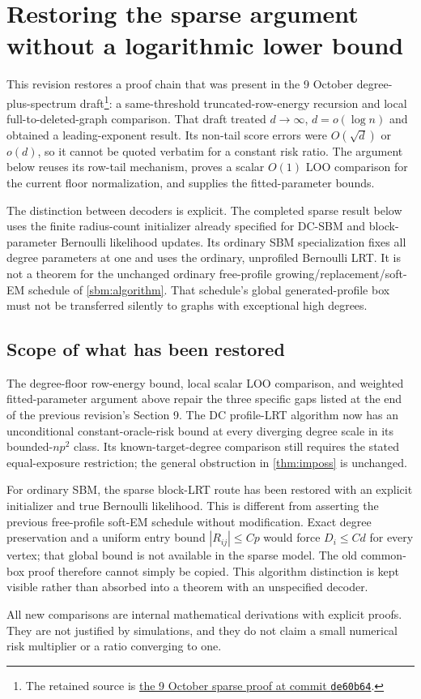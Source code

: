 \section{Restoring the sparse argument without a logarithmic lower bound}
\label{sec:sparse-restored}

This revision restores a proof chain that was present in the 9 October
degree-plus-spectrum draft\footnote{The retained source is
\href{https://github.com/zhixin0825/spectral-lrt/blob/de60b64c7d7f127ae6dc1d010c840af707a080da/paper/previous_draft/sbm_spectral_lrt_20261009.tex}{the 9 October sparse proof at commit \texttt{de60b64}}.}:
a same-threshold truncated-row-energy
recursion and local full-to-deleted-graph comparison. That draft treated
$d\to\infty$, $d=o(\log n)$ and obtained a leading-exponent result.
Its non-tail score errors were $O(\sqrt d)$ or $o(d)$, so it cannot be
quoted verbatim for a constant risk ratio. The argument below reuses its
row-tail mechanism, proves a scalar $O(1)$ LOO comparison for the current
floor normalization, and supplies the fitted-parameter bounds.

The distinction between decoders is explicit. The completed sparse
result below uses the finite radius-count initializer already specified
for DC-SBM and block-parameter Bernoulli likelihood updates. Its ordinary
SBM specialization fixes all degree parameters at one and uses the
ordinary, unprofiled Bernoulli LRT. It is not a theorem for the unchanged
ordinary free-profile growing/replacement/soft-EM schedule of
\cref{sbm:algorithm}. That schedule's global generated-profile box must
not be transferred silently to graphs with exceptional high degrees.

\subsection{Scope of what has been restored}

The degree-floor row-energy bound, local scalar LOO comparison, and
weighted fitted-parameter argument above repair the three specific
gaps listed at the end of the previous revision's Section 9. The DC
profile-LRT algorithm now has an unconditional constant-oracle-risk
bound at every diverging degree scale in its bounded-$np^2$ class.
Its known-target-degree comparison still requires the stated
equal-exposure restriction; the general obstruction in
\cref{thm:imposs} is unchanged.

For ordinary SBM, the sparse block-LRT route has been restored with an
explicit initializer and true Bernoulli likelihood. This is different
from asserting the previous free-profile soft-EM schedule without
modification. Exact degree preservation and a uniform entry bound
$|R_{ij}|\le Cp$ would force $D_i\le Cd$ for every vertex; that global
bound is not available in the sparse model. The old common-box proof
therefore cannot simply be copied. This algorithm distinction is kept
visible rather than absorbed into a theorem with an unspecified decoder.

All new comparisons are internal mathematical derivations with explicit
proofs. They are not justified by simulations, and they do not claim a
small numerical risk multiplier or a ratio converging to one.
